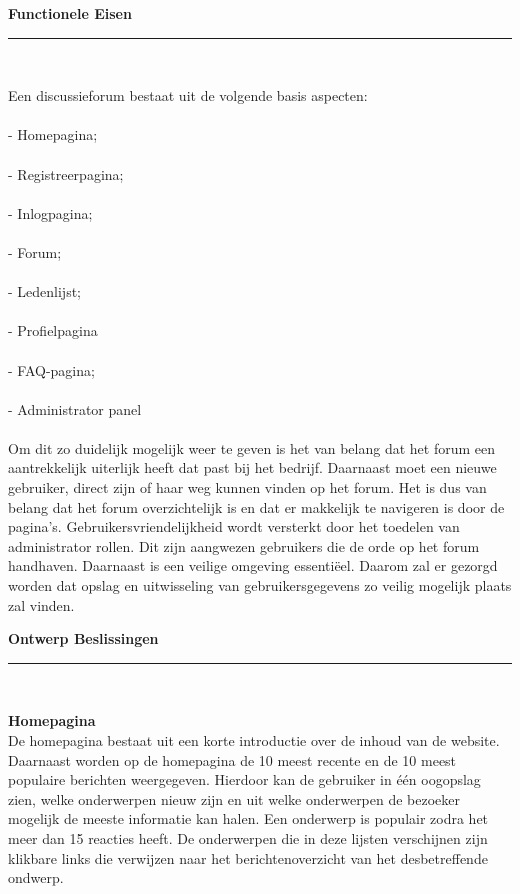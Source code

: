 \documentclass[a4paper,12pt]{article}
\newcommand{\HRule}{\rule{\linewidth}{0.5mm}}
\begin{document}
\newpage
\begin{center}
{ \LARGE \bfseries Functionele Eisen}\\[0.1cm]
\HRule \\[0.5cm]
\end{center}
Een discussieforum bestaat uit de volgende basis aspecten:\\\\
-	Homepagina;\\\\
-	Registreerpagina;\\\\
-	Inlogpagina;\\\\
-	Forum;\\\\
-	Ledenlijst;\\\\
- 	Profielpagina \\\\
-	FAQ-pagina;\\\\
-         Administrator panel\\\\

Om dit zo duidelijk mogelijk weer te geven is het van belang dat het forum een aantrekkelijk uiterlijk heeft dat past bij het bedrijf. Daarnaast moet een nieuwe gebruiker, direct zijn of haar weg kunnen vinden op het forum. Het is dus van belang dat het forum overzichtelijk is en dat er makkelijk te navigeren is door de pagina's. Gebruikersvriendelijkheid wordt versterkt door het toedelen van administrator rollen. Dit zijn aangwezen gebruikers die de orde op het forum handhaven. Daarnaast is een veilige omgeving essenti\"eel. Daarom zal er gezorgd worden dat opslag en uitwisseling van gebruikersgegevens zo veilig mogelijk plaats zal vinden.



\newpage
\begin{center}
{ \LARGE \bfseries Ontwerp Beslissingen}\\[0.1cm]
\HRule \\[0.5cm]
\end{center}
{\bfseries Homepagina} \\
De homepagina bestaat uit een korte introductie over de inhoud van de website. Daarnaast worden op de homepagina de 10 meest recente en de 10 meest populaire berichten weergegeven. Hierdoor kan de gebruiker in \'e\'en oogopslag zien, welke onderwerpen nieuw zijn en uit welke onderwerpen de bezoeker mogelijk de meeste informatie kan halen. Een onderwerp is populair zodra het meer dan 15 reacties heeft. De onderwerpen die in deze lijsten verschijnen zijn klikbare links die verwijzen naar het berichtenoverzicht van het desbetreffende ondwerp.\\
\end{document}
